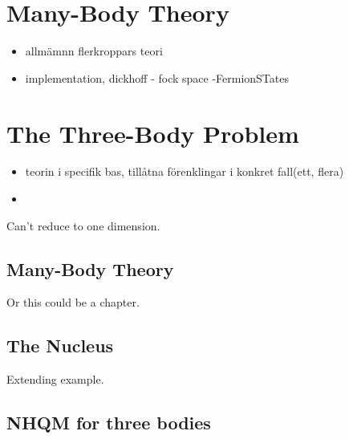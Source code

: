 \documentclass[12pt,a4paper]{report}
\begin{document}

\chapter{Many-Body Theory} %
\label{cha:many_body_theory}

\begin{itemize}
  \item allmämnn flerkroppars teori
  \item implementation, dickhoff - fock space -FermionSTates
\end{itemize} 





\chapter{The Three-Body Problem} %
\label{cha:the_three_body_problem}

\begin{itemize}
  \item teorin i specifik bas, tillåtna förenklingar i konkret fall(ett, flera)
  \item 
\end{itemize}

Can't reduce to one dimension.

\section{Many-Body Theory} %
\label{sec:many_body_theory}

Or this could be a chapter.



\section{The  Nucleus} %
\label{sec:the_^6he_nucleus}

Extending  example.


\section{NHQM for three bodies}


\end{document}
